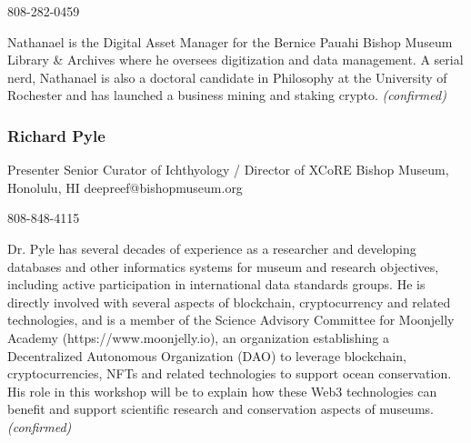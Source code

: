 \documentclass{report}
\begin{document}
                808-282-0459\newline

                Nathanael is the Digital Asset Manager for the Bernice Pauahi Bishop Museum Library \& Archives where he oversees digitization and data management. A serial nerd, Nathanael is also a doctoral candidate in Philosophy at the University of Rochester and has launched a business mining and staking crypto.
                \emph{ (confirmed) }
              

              
                \subsubsection*{ Richard  Pyle }
                Presenter\newline
                Senior Curator of Ichthyology / Director of XCoRE\newline
                Bishop Museum, Honolulu, HI
                \newline
                deepreef@bishopmuseum.org\newline
                
                808-848-4115\newline

                Dr. Pyle has several decades of experience as a researcher and developing databases and other informatics systems for museum and research objectives, including active participation in international data standards groups. He is directly involved with several aspects of blockchain, cryptocurrency and related technologies, and is a member of the Science Advisory Committee for Moonjelly Academy (https://www.moonjelly.io), an organization establishing a Decentralized Autonomous Organization (DAO) to leverage blockchain, cryptocurrencies, NFTs and related technologies to support ocean conservation. His role in this workshop will be to explain how these Web3 technologies can benefit and support scientific research and conservation aspects of museums.
                \emph{ (confirmed) }
              

              
\end{document}
